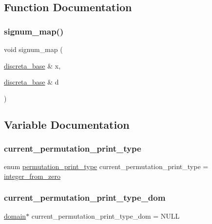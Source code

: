 \subsection{Function Documentation}
\mbox{\label{permutation_8_c_a37eb45eba12583dd550bfdf02d8add81}} 
\subsubsection{\texorpdfstring{signum\+\_\+map()}{signum\_map()}}
{\footnotesize\ttfamily void signum\+\_\+map (\begin{DoxyParamCaption}\item[{\mbox{\hyperlink{classdiscreta__base}{discreta\+\_\+base}} \&}]{x,  }\item[{\mbox{\hyperlink{classdiscreta__base}{discreta\+\_\+base}} \&}]{d }\end{DoxyParamCaption})}



\subsection{Variable Documentation}
\mbox{\label{permutation_8_c_a9a54d0723745eff2139081994296edb4}} 
\subsubsection{\texorpdfstring{current\+\_\+permutation\+\_\+print\+\_\+type}{current\_permutation\_print\_type}}
{\footnotesize\ttfamily enum \mbox{\hyperlink{permutation_8_c_affe71e1818a66436dd61925e4b1db406}{permutation\+\_\+print\+\_\+type}} current\+\_\+permutation\+\_\+print\+\_\+type = \mbox{\hyperlink{permutation_8_c_affe71e1818a66436dd61925e4b1db406a8fecd513084bd2a80ab98fffc8475866}{integer\+\_\+from\+\_\+zero}}}

\mbox{\label{permutation_8_c_a68b6d21ac5ec1da5acaba5cf7b33bc8b}} 
\subsubsection{\texorpdfstring{current\+\_\+permutation\+\_\+print\+\_\+type\+\_\+dom}{current\_permutation\_print\_type\_dom}}
{\footnotesize\ttfamily \mbox{\hyperlink{classdomain}{domain}}$\ast$ current\+\_\+permutation\+\_\+print\+\_\+type\+\_\+dom = N\+U\+LL}

